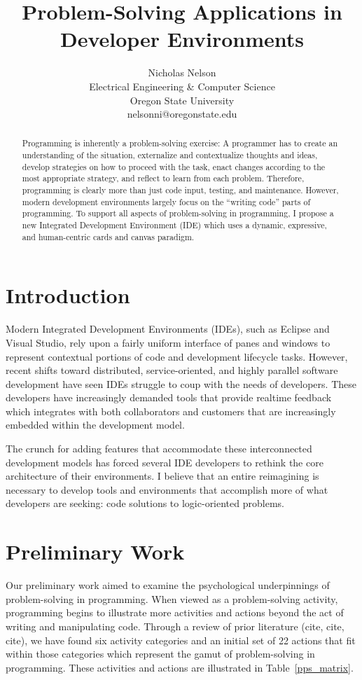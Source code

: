 \documentclass{ppig}
\title{Problem-Solving Applications in Developer Environments}
\author{Nicholas Nelson \\
  Electrical Engineering \& Computer Science \\
  Oregon State University \\
  nelsonni@oregonstate.edu}
\date{}
\begin{document}
\maketitle
\thispagestyle{empty}

\begin{abstract}
Programming is inherently a problem-solving exercise: A programmer has to create an understanding of the situation, externalize and contextualize thoughts and ideas, develop strategies on how to proceed with the task, enact changes according to the most appropriate strategy, and reflect to learn from each problem.
Therefore, programming is clearly more than just code input, testing, and maintenance.
However, modern development environments largely focus on the ``writing code'' parts of programming.
To support all aspects of problem-solving in programming, I propose a new Integrated Development Environment (IDE) which uses a dynamic, expressive, and human-centric cards and canvas paradigm.
\end{abstract}

\section{Introduction}
Modern Integrated Development Environments (IDEs), such as Eclipse and Visual Studio, rely upon a fairly uniform interface of panes and windows to represent contextual portions of code and development lifecycle tasks.
However, recent shifts toward distributed, service-oriented, and highly parallel software development have seen IDEs struggle to coup with the needs of developers.
These developers have increasingly demanded tools that provide realtime feedback which integrates with both collaborators and customers that are increasingly embedded within the development model.

The crunch for adding features that accommodate these interconnected development models has forced several IDE developers to rethink the core architecture of their environments.
I believe that an entire reimagining is necessary to develop tools and environments that accomplish more of what developers are seeking: code solutions to logic-oriented problems.

\section{Preliminary Work}
Our preliminary work aimed to examine the psychological underpinnings of problem-solving in programming.
When viewed as a problem-solving activity, programming begins to illustrate more activities and actions beyond the act of writing and manipulating code.
Through a review of prior literature (cite, cite, cite), we have found six activity categories and an initial set of 22 actions that fit within those categories which represent the gamut of problem-solving in programming.
These activities and actions are illustrated in Table~\ref{pps_matrix}.
\end{document}
